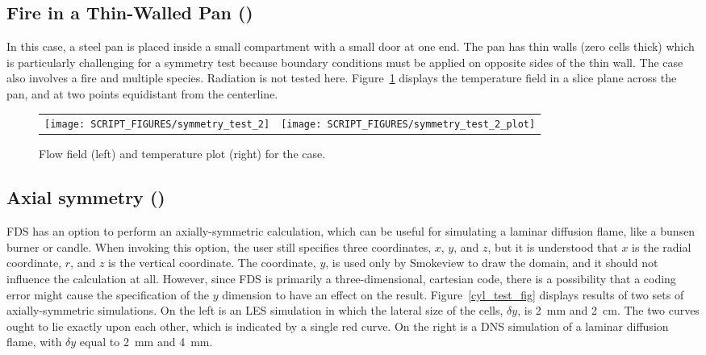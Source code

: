 \documentclass[11pt]{book}
\begin{document}
\subsection{Fire in a Thin-Walled Pan (\texorpdfstring{}{symmetry\_test\_2})}
\label{symmetry_test_2}

In this case, a steel pan is placed inside a small compartment with a small door at one end. The pan has thin walls (zero cells thick) which is particularly challenging for a symmetry test because boundary conditions must be applied on opposite sides of the thin wall. The case also involves a fire and multiple species. Radiation is not tested here. Figure~\ref{symmetry_test_2_fig} displays the temperature field in a slice plane across the pan, and at two points equidistant from the centerline.


\begin{figure}[!ht]
\begin{tabular*}{\textwidth}{lr}
\texttt{[image: SCRIPT\_FIGURES/symmetry\_test\_2]} &
\texttt{[image: SCRIPT\_FIGURES/symmetry\_test\_2\_plot]}
\end{tabular*}
\caption[The  case]{Flow field (left) and temperature plot (right) for the  case.}
\label{symmetry_test_2_fig}
\end{figure}



\subsection{Axial symmetry (\texorpdfstring{}{cyl\_test})}
\label{cyl_test}

FDS has an option to perform an axially-symmetric calculation, which can be useful for simulating a laminar diffusion flame, like a bunsen burner or candle. When invoking this option, the user still specifies three coordinates, $x$, $y$, and $z$, but it is understood that $x$ is the radial coordinate, $r$, and $z$ is the vertical coordinate. The coordinate, $y$, is used only by Smokeview to draw the domain, and it should not influence the calculation at all. However, since FDS is primarily a three-dimensional, cartesian code, there is a possibility that a coding error might cause the specification of the $y$ dimension to have an effect on the result. Figure~\ref{cyl_test_fig} displays results of two sets of axially-symmetric simulations. On the left is an LES simulation in which the lateral size of the cells, $\delta y$, is 2~mm and 2~cm. The two curves ought to lie exactly upon each other, which is indicated by a single red curve. On the right is a DNS simulation of a laminar diffusion flame, with $\delta y$ equal to 2~mm and 4~mm.
\end{document}
